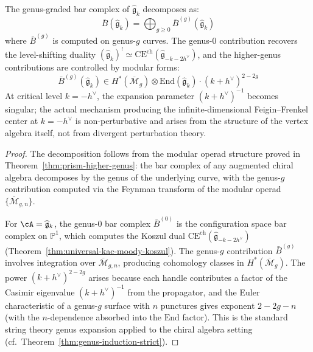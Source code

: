 \begin{theorem}\label{thm:km-higher-genus-corrections}
The genus-graded bar complex of $\widehat{\mathfrak{g}}_k$ decomposes as:
\begin{equation}
\bar{B}(\widehat{\mathfrak{g}}_k) = \bigoplus_{g \geq 0} \bar{B}^{(g)}(\widehat{\mathfrak{g}}_k)
\end{equation}
where $\bar{B}^{(g)}$ is computed on genus-$g$ curves. The genus-$0$
contribution recovers the level-shifting duality
$(\widehat{\mathfrak{g}}_k)^! \simeq
\mathrm{CE}^{\mathrm{ch}}(\widehat{\mathfrak{g}}_{-k-2h^\vee})$,
and the higher-genus contributions are controlled by modular forms:
\begin{equation}
\bar{B}^{(g)}(\widehat{\mathfrak{g}}_k) \in H^*(\overline{\mathcal{M}}_g) \otimes \mathrm{End}(\widehat{\mathfrak{g}}_k) \cdot (k+h^\vee)^{2-2g}
\end{equation}
At critical level $k = -h^\vee$, the expansion parameter $(k+h^\vee)^{-1}$ becomes singular; the actual mechanism producing the infinite-dimensional Feigin--Frenkel center at $k = -h^\vee$ is non-perturbative and arises from the structure of the vertex algebra itself, not from divergent perturbation theory.
\end{theorem}

\begin{proof}
The decomposition follows from the modular operad structure proved in Theorem~\ref{thm:prism-higher-genus}: the bar complex of any augmented chiral algebra decomposes by the genus of the underlying curve, with the genus-$g$ contribution computed via the Feynman transform of the modular operad $\{\overline{\mathcal{M}}_{g,n}\}$.

For $\cA = \widehat{\mathfrak{g}}_k$, the genus-0 bar complex
$\bar{B}^{(0)}$ is the configuration space bar complex on
$\mathbb{P}^1$, which computes the Koszul dual
\(\mathrm{CE}^{\mathrm{ch}}(\widehat{\mathfrak{g}}_{-k-2h^\vee})\)
(Theorem~\ref{thm:universal-kac-moody-koszul}). The genus-$g$
contribution $\bar{B}^{(g)}$ involves integration over
$\overline{\mathcal{M}}_{g,n}$, producing cohomology classes in
$H^*(\overline{\mathcal{M}}_g)$. The power $(k+h^\vee)^{2-2g}$ arises
because each handle contributes a factor of the Casimir eigenvalue
$(k+h^\vee)^{-1}$ from the propagator, and the Euler characteristic of
a genus-$g$ surface with $n$ punctures gives exponent $2-2g-n$ (with
the $n$-dependence absorbed into the $\mathrm{End}$ factor). This is
the standard string theory genus expansion applied to the chiral algebra
setting (cf.\ Theorem~\ref{thm:genus-induction-strict}).
\end{proof}

